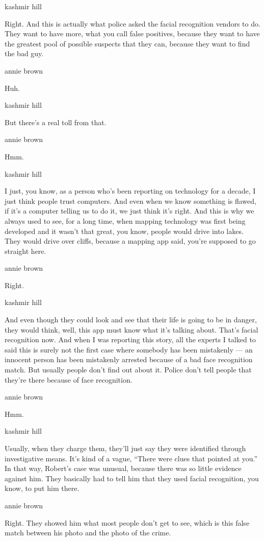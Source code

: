 kashmir hill

Right. And this is actually what police asked the facial recognition
vendors to do. They want to have more, what you call false positives,
because they want to have the greatest pool of possible suspects that
they can, because they want to find the bad guy.

annie brown

Huh.

kashmir hill

But there's a real toll from that.

annie brown

Hmm.

kashmir hill

I just, you know, as a person who's been reporting on technology for a
decade, I just think people trust computers. And even when we know
something is flawed, if it's a computer telling us to do it, we just
think it's right. And this is why we always used to see, for a long
time, when mapping technology was first being developed and it wasn't
that great, you know, people would drive into lakes. They would drive
over cliffs, because a mapping app said, you're supposed to go straight
here.

annie brown

Right.

kashmir hill

And even though they could look and see that their life is going to be
in danger, they would think, well, this app must know what it's talking
about. That's facial recognition now. And when I was reporting this
story, all the experts I talked to said this is surely not the first
case where somebody has been mistakenly --- an innocent person has been
mistakenly arrested because of a bad face recognition match. But usually
people don't find out about it. Police don't tell people that they're
there because of face recognition.

annie brown

Hmm.

kashmir hill

Usually, when they charge them, they'll just say they were identified
through investigative means. It's kind of a vague, ``There were clues
that pointed at you.'' In that way, Robert's case was unusual, because
there was so little evidence against him. They basically had to tell him
that they used facial recognition, you know, to put him there.

annie brown

Right. They showed him what most people don't get to see, which is this
false match between his photo and the photo of the crime.

